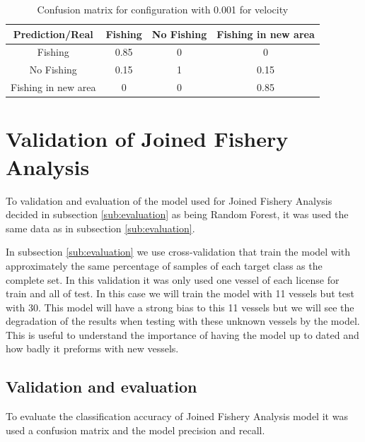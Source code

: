 \begin {table}[H]
\begin{center}
\begin{tabular}{c|c|c|c}
Prediction/Real & \textbf{Fishing} & \textbf{No Fishing} & \textbf{Fishing in new area} \\\hline
Fishing & 0.85 &  0   & 0           \\
No Fishing & 0.15 & 1    & 0.15           \\
Fishing in new area & 0   & 0 & 0.85     
\label{table:val_sfa_cm}
\end{tabular}
\caption {Confusion matrix for configuration with 0.001 for velocity}
\end{center}
\end {table}
 
 



\section{Validation of Joined Fishery Analysis} %
\label{sub:val_JFA}

To validation and evaluation of the model used for Joined Fishery Analysis decided in subsection \ref{sub:evaluation} as being Random Forest, it was used the same data as in subsection \ref{sub:evaluation}.

In subsection \ref{sub:evaluation} we use cross-validation \cite{CrossValidatory} that train the model with approximately the same percentage of samples of each target class as the complete set.
In this validation it was only used one vessel of each license for train and all of test. In this case we will train the model with 11 vessels but test with 30. This model will have a strong bias to this 11 vessels but we will see the degradation of the results when testing with these unknown vessels by the model.
This is useful to understand the importance of having the model up to dated and how badly it preforms with new vessels. 





\subsection{Validation and evaluation}
\label{sec:val_JFA_val_eva}
To evaluate the classification accuracy of Joined Fishery Analysis model it was used a confusion matrix and the model precision and recall.

